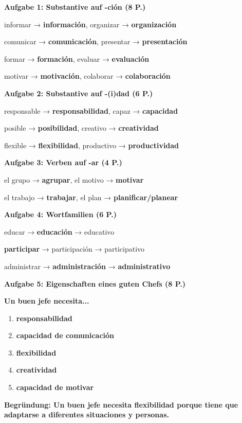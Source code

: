 \documentclass[11pt,a4paper]{article}
\newcommand{\lsg}[1]{\textcolor{loesung}{\textbf{#1}}}
\begin{document}
\begin{gruppeBbox}

\textbf{Aufgabe 1: Substantive auf -ción (8 P.)}

informar → \lsg{información}, organizar → \lsg{organización}

comunicar → \lsg{comunicación}, presentar → \lsg{presentación}

formar → \lsg{formación}, evaluar → \lsg{evaluación}

motivar → \lsg{motivación}, colaborar → \lsg{colaboración}

\vspace{0.5em}

\textbf{Aufgabe 2: Substantive auf -(i)dad (6 P.)}

responsable → \lsg{responsabilidad}, capaz → \lsg{capacidad}

posible → \lsg{posibilidad}, creativo → \lsg{creatividad}

flexible → \lsg{flexibilidad}, productivo → \lsg{productividad}

\vspace{0.5em}

\textbf{Aufgabe 3: Verben auf -ar (4 P.)}

el grupo → \lsg{agrupar}, el motivo → \lsg{motivar}

el trabajo → \lsg{trabajar}, el plan → \lsg{planificar/planear}

\vspace{0.5em}

\textbf{Aufgabe 4: Wortfamilien (6 P.)}

educar → \lsg{educación} → educativo

\lsg{participar} → participación → participativo

administrar → \lsg{administración} → \lsg{administrativo}

\vspace{0.5em}

\textbf{Aufgabe 5: Eigenschaften eines guten Chefs (8 P.)}

\lsg{Un buen jefe necesita...}
\begin{enumerate}[leftmargin=2em, nosep]
    \item \lsg{responsabilidad}
    \item \lsg{capacidad de comunicación}
    \item \lsg{flexibilidad}
    \item \lsg{creatividad}
    \item \lsg{capacidad de motivar}
\end{enumerate}

\lsg{Begründung: Un buen jefe necesita flexibilidad porque tiene que adaptarse a diferentes situaciones y personas.}

\end{gruppeBbox}
\end{document}

